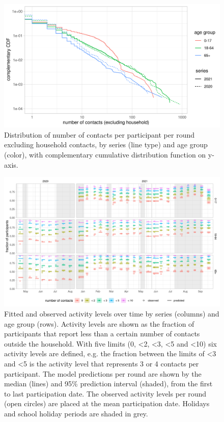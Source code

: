 \documentclass[fleqn,10pt]{wlscirep}
\begin{document}
\begin{figure}[ht]
\centering
\includegraphics[width=\linewidth]{../figures/powerlaw_contacts.png}
\caption{Distribution of number of contacts per participant per round excluding household contacts, by series (line type) and age group (color), with complementary cumulative distribution function on y-axis.}
\label{fig:powerlaw}
\end{figure}

\clearpage

\begin{figure}[ht]
\centering
\includegraphics[width=\linewidth]{../figures/prediction_studypopulation_cat6.png}
\caption{Fitted and observed activity levels over time by series (columns) and age group (rows). Activity levels are shown as the fraction of participants that report less than a certain number of contacts outside the household. With five limits (0, <2, <3, <5 and <10) six activity levels are defined, e.g. the fraction between the limits of <3 and <5 is the activity level that represents 3 or 4 contacts per participant. The model predictions per round are shown by the median (lines) and 95\% prediction interval (shaded), from the first to last participation date. The observed activity levels per round (open circles) are placed at the mean participation date. Holidays and school holiday periods are shaded in grey.}
\label{fig:studypop}
\end{figure}
\end{document}
